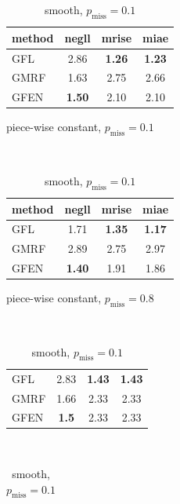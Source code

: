 \documentclass[a4paper, 11pt]{article}
\newcommand{\ra}[1]{\renewcommand{\arraystretch}{#1}}
\begin{document}
\begin{table}[tb]
    \centering
    \small
    \begin{subtable}[b]{.4\linewidth}
      \centering
      \begin{tabular}{l|c|c|c}
         method & negll & mrise & miae \\ \midrule
         GFL  & 2.86 & \textbf{1.26} &  \textbf{1.23} \\ 
         GMRF & 1.63 & 2.75 &  2.66 \\ 
         GFEN & \textbf{1.50} & 2.10 &  2.10  \\ 
     \end{tabular}
     \caption{piece-wise constant, $p_\text{miss} = 0.1$}
    \end{subtable}%
    ~
    \begin{subtable}[b]{.4\linewidth}
      \centering
      \begin{tabular}{l|c|c|c}
         method & negll & mrise & miae \\ \midrule
         GFL & 1.71 & \textbf{1.35} & \textbf{1.17} \\ 
         GMRF & 2.89 & 2.75 & 2.97 \\ 
         GFEN & \textbf{1.40} & 1.91 & 1.86 \\ 
     \end{tabular}
     \caption{piece-wise constant, $p_\text{miss} = 0.8$}
    \end{subtable}\vspace{10px}\\
    \begin{subtable}[b]{.4\linewidth}
      \centering
      \begin{tabular}{l|c|c|c}
         GFL &  2.83 & \textbf{1.43} & \textbf{1.43} \\ 
         GMRF & 1.66 & 2.33 & 2.33 \\ 
         GFEN & \textbf{1.5}  & 2.33 & 2.33\\ 
      \end{tabular}
     \caption{smooth, $p_\text{miss} = 0.1$}
    \end{subtable}%
    ~
    \begin{subtable}[b]{.4\linewidth}
      \centering
      \begin{tabular}{l|c|c|c}

\end{tabular}
\end{subtable}
\end{table}
\end{document}
